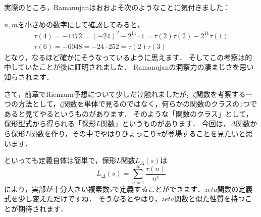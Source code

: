 実際のところ，Ramanujanはおおよそ次のようなことに気付きました：
$n,m$を小さめの数字にして確認してみると，
\begin{eqnarray*}
	\tau(4)=-1472=(-24)^2-2^{11} \cdot 1=\tau(2)\tau(2)-2^{11}\tau(1) \\
	\tau(6)=-6048=-24 \cdot 252 = \tau(2) \tau(3)
\end{eqnarray*}
となり，なるほど確かにそうなっているように思えます．
そしてこの考察は的中していたことが後に証明されました．
Ramanujanの洞察力の凄まじさを思い知らされます．

さて，前章でRiemann予想について少しだけ触れましたが，$\zeta$関数を考察する一つの方法として，$\zeta$関数を単体で見るのではなく，何らかの関数のクラスの$1$つであると見てやるというものがあります．
そのような「関数のクラス」として，保形型式から得られる「保形$L$関数」というものがあります．
今回は，$\Delta$関数から保形$L$関数を作り，その中でやはりひょっこり$\pi$が登場することを見たいと思います．

といっても定義自体は簡単で，保形$L$関数$L_{\Delta}(s)$は
\[
	L_{\Delta}(s)=\sum_{n=1}^{\infty}\frac {\tau (n)}{n^s}
\]
により，実部が十分大きい複素数$s$で定義することができます．$zeta$関数の定義式を少し変えただけですね．
そうなるとやはり，$zeta$関数と似た性質を持つことが期待されます．

